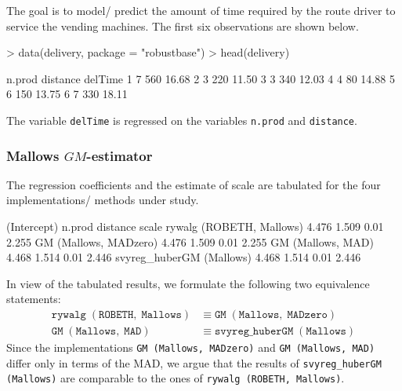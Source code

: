\documentclass[a4paper]{scrartcl}
\begin{document}
\noindent The goal is to model/ predict the amount of time required by the route driver to service the vending machines. The first six observations are shown below.

\begin{Schunk}
\begin{Sinput}
> data(delivery, package = "robustbase")
> head(delivery)
\end{Sinput}
\begin{Soutput}
  n.prod distance delTime
1      7      560   16.68
2      3      220   11.50
3      3      340   12.03
4      4       80   14.88
5      6      150   13.75
6      7      330   18.11
\end{Soutput}
\end{Schunk}

\noindent The variable \texttt{delTime} is regressed on the variables \texttt{n.prod} and \texttt{distance}.


\subsubsection{Mallows $GM$-estimator}\label{sec:delivery_mallows}
\noindent The regression coefficients and the estimate of scale are tabulated for the four implementations/ methods under study.
 
\begin{Schunk}
\begin{Soutput}
                         (Intercept) n.prod distance scale
rywalg (ROBETH, Mallows)       4.476  1.509     0.01 2.255
GM (Mallows, MADzero)          4.476  1.509     0.01 2.255
GM (Mallows, MAD)              4.468  1.514     0.01 2.446
svyreg_huberGM (Mallows)       4.468  1.514     0.01 2.446
\end{Soutput}
\end{Schunk}

\noindent In view of the tabulated results, we formulate the following two equivalence statements: 
\begin{align*}
   \mathtt{rywalg \;(ROBETH, \;Mallows)} &\equiv \mathtt{GM \;(Mallows, \;MADzero)} \\
   \mathtt{GM \;(Mallows, \;MAD)} &\equiv \mathtt{svyreg\_huberGM \;(Mallows)} 
\end{align*}
\noindent Since the implementations \texttt{GM (Mallows, MADzero)} and \texttt{GM (Mallows, MAD)} differ only in terms of the MAD, we argue that the results of \texttt{svyreg\_huberGM (Mallows)} are comparable to the ones of \texttt{rywalg (ROBETH, Mallows)}.
\end{document}
